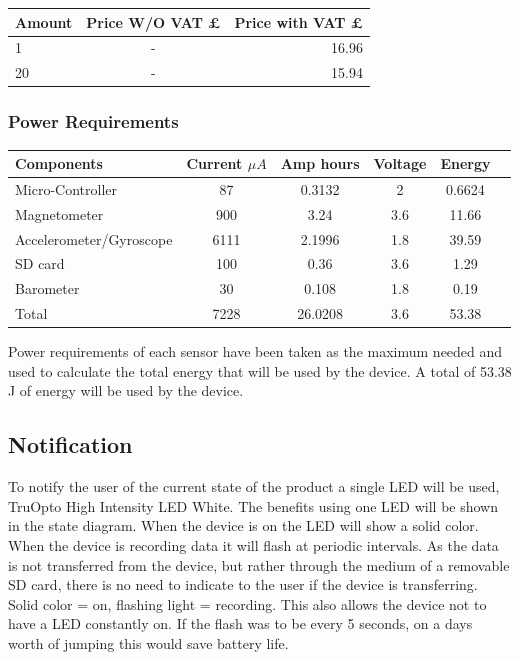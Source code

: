 \documentclass{report}
\begin{document}
\begin{center}
  \begin{tabular}{ | l | c | r |}
    \hline
    Amount & Price W/O VAT £ & Price with VAT £ \\ \hline
    1 & - & 16.96 \\ \hline
    20 & - & 15.94 \\ \hline
	\end{tabular}
\end{center}

\subsubsection{Power Requirements} 
\begin{center}
\begin{tabular}{ | l | c | c | c | c | r |}
\hline
  Components&Current $\mu A$&Amp hours&Voltage&Energy\\ \hline
   Micro-Controller& 87 & 0.3132 & 2& 0.6624  \\ \hline
   Magnetometer& 900 & 3.24 & 3.6   &11.66  \\ \hline
   Accelerometer/Gyroscope&6111 & 2.1996 &1.8    &39.59 \\ \hline
   SD card& 100 &0.36  & 3.6   & 1.29   \\ \hline
   Barometer&30  &0.108  &  1.8 & 0.19 \\ \hline
   Total&7228 &26.0208  & 3.6  &53.38  \\ \hline
  	\end{tabular}
\end{center}

Power requirements of each sensor have been taken as the maximum needed and used to calculate the total energy that will be used by the device. A total of 53.38  J of energy will be used by the device. 

\subsection{Notification}
To notify the user of the current state of the product a single LED will be used, TruOpto High Intensity LED White. The benefits using one LED will be shown in the state diagram. When the device is on the LED will show a solid color. When the device is recording data it will flash at periodic intervals. As the data is not transferred from the device, but rather through the medium of a removable SD card, there is no need to indicate to the user if the device is transferring. Solid color = on, flashing light = recording. 
This also allows the device not to have a LED constantly on. If the flash was to be every 5 seconds, on a days worth of jumping this would save battery life.
\end{document}
